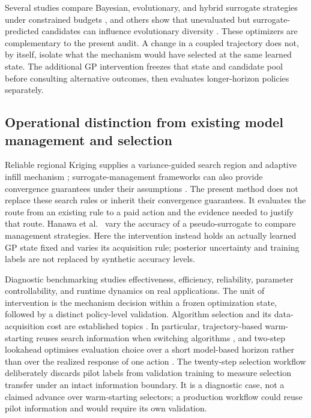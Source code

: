 \documentclass[]{interact}
\begin{document}
\endgroup

Several studies compare Bayesian, evolutionary, and hybrid surrogate strategies under constrained budgets \citep{ref21}, and others show that unevaluated but surrogate-predicted candidates can influence evolutionary diversity \citep{ref22}. These optimizers are complementary to the present audit. A change in a coupled trajectory does not, by itself, isolate what the mechanism would have selected at the same learned state. The additional GP intervention freezes that state and candidate pool before consulting alternative outcomes, then evaluates longer-horizon policies separately.

\hypertarget{operational-distinction-from-existing-model-management-and-selection}{%
\subsection{Operational distinction from existing model management and selection}\label{operational-distinction-from-existing-model-management-and-selection}}

Reliable regional Kriging supplies a variance-guided search region and adaptive infill mechanism \citep{ref35}; surrogate-management frameworks can also provide convergence guarantees under their assumptions \citep{ref38}. The present method does not replace these search rules or inherit their convergence guarantees. It evaluates the route from an existing rule to a paid action and the evidence needed to justify that route. Hanawa et al.~\citep{ref20} vary the accuracy of a pseudo-surrogate to compare management strategies. Here the intervention instead holds an actually learned GP state fixed and varies its acquisition rule; posterior uncertainty and training labels are not replaced by synthetic accuracy levels.

Diagnostic benchmarking \citep{ref34} studies effectiveness, efficiency, reliability, parameter controllability, and runtime dynamics on real applications. The unit of intervention is the mechanism decision within a frozen optimization state, followed by a distinct policy-level validation. Algorithm selection and its data-acquisition cost are established topics \citep{ref36,ref37}. In particular, trajectory-based warm-starting reuses search information when switching algorithms \citep{ref37}, and two-step lookahead optimises evaluation choice over a short model-based horizon rather than over the realized response of one action \citep{ref39}. The twenty-step selection workflow deliberately discards pilot labels from validation training to measure selection transfer under an intact information boundary. It is a diagnostic case, not a claimed advance over warm-starting selectors; a production workflow could reuse pilot information and would require its own validation.
\end{document}
